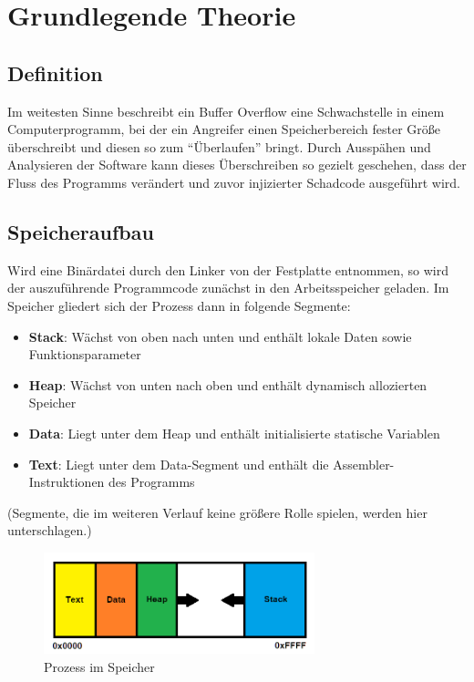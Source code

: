 \section{Grundlegende Theorie}
\subsection{Definition}
Im weitesten Sinne beschreibt ein Buffer Overflow eine Schwachstelle in einem Computerprogramm,
bei der ein Angreifer einen Speicherbereich fester Größe überschreibt und diesen so zum “Überlaufen” bringt.
Durch Ausspähen und Analysieren der Software kann dieses Überschreiben so gezielt geschehen, dass der Fluss des
Programms verändert und zuvor injizierter Schadcode ausgeführt wird. \cite{NISTSP}
\subsection{Speicheraufbau}
Wird eine Binärdatei durch den Linker von der Festplatte entnommen, so wird der auszuführende Programmcode
zunächst in den Arbeitsspeicher geladen. Im Speicher gliedert sich der Prozess dann in folgende Segmente:
\begin{itemize}
    \item \textbf{Stack}: Wächst von oben nach unten und enthält lokale Daten sowie Funktionsparameter
    \item \textbf{Heap}: Wächst von unten nach oben und enthält dynamisch allozierten Speicher
    \item \textbf{Data}: Liegt unter dem Heap und enthält initialisierte statische Variablen
    \item \textbf{Text}: Liegt unter dem Data-Segment und enthält die Assembler-Instruktionen des Programms
\end{itemize}

(Segmente, die im weiteren Verlauf keine größere Rolle spielen, werden hier unterschlagen.)
\begin{figure}[h]
    \centering
    \includegraphics[width=0.7\textwidth,height=0.75\textheight,keepaspectratio]{images/process.png}
    \caption{Prozess im Speicher}
\end{figure}

